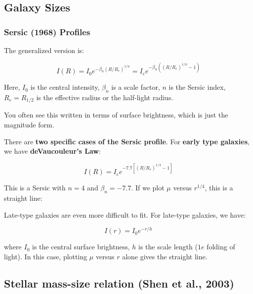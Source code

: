 \documentclass{article}
\begin{document}
\subsection{Galaxy Sizes}
\subsubsection{Sersic (1968) Profiles}

The generalized version is:

\begin{equation}
    I(R) = I_0 e^{-\beta_n\left(R/R_e\right)^{1/n}} = I_e e^{-\beta_n\left(\left (R/R_e\right)^{1/n}-1\right)}
\end{equation}

Here, $I_0$ is the central intensity, $\beta_n$ is a scale factor, $n$ is the Sersic index, $R_e = R_{1/2}$ is the effective radius or the half-light radius. 

You often see this written in terms of surface brightness, which is just the magnitude form. 

There are \textbf{two specific cases of the Sersic profile}. For \textbf{early type galaxies}, we have \textbf{deVaucouleur's Law}:

\begin{equation}
    I(R) = I_e e^{-7.7\left[\left(R/R_e\right)^{1/4} - 1\right]}
\end{equation}

This is a Sersic with $n = 4$ and $\beta_n = -7.7$. If we plot $\mu$ versus $r^{1/4}$, this is a straight line:


Late-type galaxies are even more difficult to fit. For late-type galaxies, we have:

\begin{equation}
    I(r) = I_0 e^{-r/h}
\end{equation}

where $I_0$ is the central surface brightness, $h$ is the scale length ($1e$ folding of light). In this case, plotting $\mu$ versus $r$ alone gives the straight line. 

\subsection{Stellar mass-size relation (Shen et al., 2003)}
\end{document}
